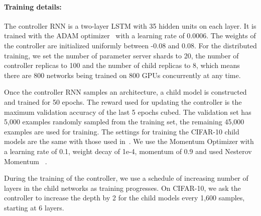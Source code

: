 \documentclass{article} \usepackage{iclr2017_conference,times}
\begin{document}
\paragraph{Training details:} The controller RNN is a two-layer LSTM with 35 hidden units on each layer. It is trained with the ADAM optimizer~\citep{ADAM} with a learning rate of 0.0006. The weights of the controller are initialized uniformly between -0.08 and 0.08. For the distributed training, we set the number of parameter server shards  to 20, the number of controller replicas  to 100 and the number of child replicas  to 8, which means there are 800 networks being trained on 800 GPUs concurrently at any time.

Once the controller RNN samples an architecture, a child model is constructed and trained for 50 epochs. The reward used for updating the controller is the maximum validation accuracy of the last 5 epochs cubed. The validation set has 5,000 examples randomly sampled from the training set, the remaining 45,000 examples are used for training. The settings for training the CIFAR-10 child models are the same with those used in~\cite{Huang2016Densely}. We use the Momentum Optimizer with a learning rate of 0.1, weight decay of 1e-4, momentum of 0.9 and used Nesterov Momentum ~\citep{icml2013_sutskever13}. 





During the training of the controller, we use a schedule of increasing number of layers in the child networks as training progresses. On CIFAR-10, we ask the controller to increase the depth by 2 for the child models every 1,600 samples, starting at 6 layers. 
\end{document}
